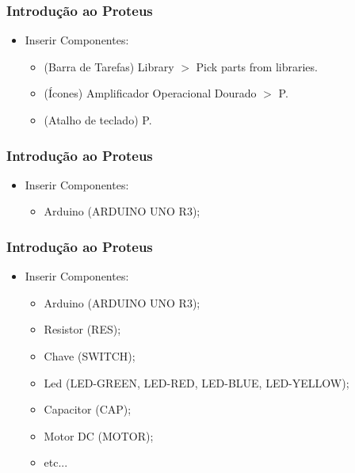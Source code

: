 \documentclass{beamer}
\begin{document}
\begin{frame}
	\frametitle{Introdução ao Proteus}
	\begin{itemize}
	\item Inserir Componentes:
		\begin{itemize}
		\item (Barra de Tarefas) Library $>$ Pick parts from libraries.
		\item (Ícones) Amplificador Operacional Dourado $>$ P.\\
		 \hspace{50pt}
		\item (Atalho de teclado) P.
		\end{itemize}
	\end{itemize}
\end{frame}

\begin{frame}
	\frametitle{Introdução ao Proteus}
	\begin{itemize}
	\item Inserir Componentes:
		\begin{itemize}
		\item Arduino (ARDUINO UNO R3);
		\end{itemize}
	\end{itemize}
	\begin{center}
		 \hspace{50pt}
	\end{center}
\end{frame}

\begin{frame}
	\frametitle{Introdução ao Proteus}
	\begin{itemize}
	\item Inserir Componentes:
		\begin{itemize}
		\item Arduino (ARDUINO UNO R3);
		\item Resistor (RES);
		\item Chave (SWITCH);
		\item Led (LED-GREEN, LED-RED, LED-BLUE, LED-YELLOW);
		\item Capacitor (CAP);
		\item Motor DC (MOTOR);
		\item etc...
		\end{itemize}
	\end{itemize}
\end{frame}
\end{document}
